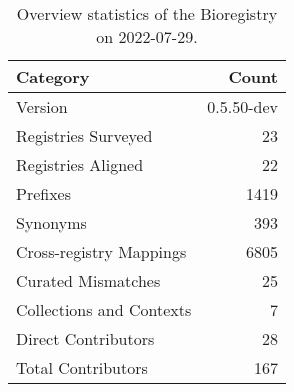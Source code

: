 \begin{table}
\centering
\caption{Overview statistics of the Bioregistry on 2022-07-29.}
\label{tab:bioregistry-summary}
\begin{tabular}{lr}
\toprule
                Category &      Count \\
\midrule
                 Version & 0.5.50-dev \\
     Registries Surveyed &         23 \\
      Registries Aligned &         22 \\
                Prefixes &       1419 \\
                Synonyms &        393 \\
 Cross-registry Mappings &       6805 \\
      Curated Mismatches &         25 \\
Collections and Contexts &          7 \\
     Direct Contributors &         28 \\
      Total Contributors &        167 \\
\bottomrule
\end{tabular}
\end{table}
